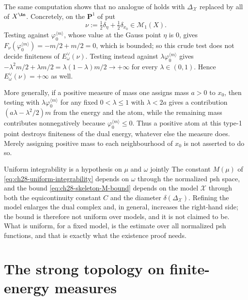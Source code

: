 \begin{example}
\label{ex:ch28-whole-space-not-admissible}
The same computation shows that no analogue of
 holds with $\Delta_{\mathcal X}$
replaced by all of $X^{\An}$.  Concretely, on the $\mathbf P^1$ of
 put
\[
 \nu:=\tfrac12\delta_\eta+\tfrac12\delta_{x_0}\in\mathcal M_1(X).
\]
Testing against $\varphi_0^{\langle m\rangle}$, whose value at the Gauss
point $\eta$ is $0$, gives
$F_\nu(\varphi_0^{\langle m\rangle})=-m/2+m/2=0$, which is bounded; so this
crude test does not decide finiteness of $E^\vee_\omega(\nu)$.  Testing
instead against $\lambda\varphi_0^{\langle m\rangle}$ gives
$-\lambda^2m/2+\lambda m/2=\lambda(1-\lambda)m/2\to+\infty$ for every
$\lambda\in(0,1)$.  Hence $E^\vee_\omega(\nu)=+\infty$ as well.

More generally, if a positive measure of mass one assigns mass $a>0$ to
$x_0$, then testing with $\lambda\varphi_0^{\langle m\rangle}$ for any
fixed $0<\lambda\leq1$ with $\lambda<2a$ gives a contribution
$(a\lambda-\lambda^2/2)m$ from the energy and the atom, while the remaining
mass contributes nonnegatively because
$\varphi_0^{\langle m\rangle}\leq0$.  Thus a positive atom at this type-1
point destroys finiteness of the dual energy, whatever else the measure
does.  Merely assigning positive mass to each neighbourhood of $x_0$ is
not asserted to do so.
\end{example}

\begin{warning}{Uniform integrability is a hypothesis on $\mu$ and
$\omega$ jointly}
The constant $M(\mu)$ of \eqref{eq:ch28-uniform-integrability} depends on
$\omega$ through the normalized psh space, and the bound
\eqref{eq:ch28-skeleton-M-bound} depends on the model $\mathcal X$ through
both the equicontinuity constant $C$ and the diameter
$\delta(\Delta_{\mathcal X})$.  Refining the model enlarges the dual
complex and, in general, increases the right-hand side; the bound is
therefore not uniform over models, and it is not claimed to be.  What is
uniform, for a fixed model, is the estimate over all normalized psh
functions, and that is exactly what the existence proof needs.
\end{warning}

\section{The strong topology on finite-energy measures}
\label{sec:ch28-strong-measures}


